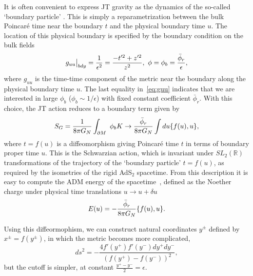 \documentclass[12pt]{article}
\begin{document}
It is often convenient to express JT gravity as the dynamics of the so-called `boundary particle' \cite{ Maldacena:2016upp, Engelsoy:2016xyb, Jensen:2016pah}. This is simply a reparametrization between the bulk Poincar\'e time near the boundary $t$ and the physical boundary time $u$. The location of this physical boundary is specified by the boundary condition on the bulk fields
\begin{align}\label{eq:guu}
g_{u u}\big|_{bdy}  = {1 \over \epsilon^2} = {- t'^2 + z'^2 \over z^2}, \
\phi = \phi_b = {\bar{\phi}_r \over \epsilon},
\end{align}
where $g_{uu}$ is the time-time component of the metric near the boundary along the physical boundary time $u$. The last equality in~\eqref{eq:guu} indicates that we are interested in large $\phi_{b}$ ($\phi_{b}\sim 1/\epsilon$) with fixed constant coefficient $\bar{\phi}_{r}$. With this choice, the JT action reduces to a boundary term given by
\begin{align}
S_G =  {1 \over 8 \pi G_N}\int_{\partial M} \  \phi_b  K  \rightarrow {\bar{\phi}_r \over 8 \pi G_N} \int du \{ f(u), u \},
\end{align}
where $t=f(u)$ is a diffeomorphism giving Poincar\'e time $t$ in terms of boundary proper time $u$. This is the Schwarzian action, which is invariant under $SL_2(\mathbb{R})$ transformations of the trajectory of the `boundary particle' $t=f(u)$, as required by the isometries of the rigid AdS$_2$ spacetime. From this description it is easy to compute the ADM energy of the spacetime~\cite{ Maldacena:2016upp, Engelsoy:2016xyb}, defined as the Noether charge under physical time translations  $u \rightarrow u + \delta u$
\begin{align}
E(u) = - {\bar{\phi}_r \over 8 \pi G_N} \{ f(u), u \}. \label{energygeneral}
\end{align}

Using this diffeormophism, we can construct natural coordinates $y^\pm$ defined by $x^\pm = f(y^\pm)$, in which the metric becomes more complicated,
\begin{equation}\label{eq:ymetric}
	ds^2 = -\frac{4f'(y^+)f'(y^-) dy^+ dy^-}{(f(y^+)-f(y^-))^2},
\end{equation}
but the cutoff is simpler, at constant $\frac{y^+-y^-}{2}=\epsilon$.
\end{document}
